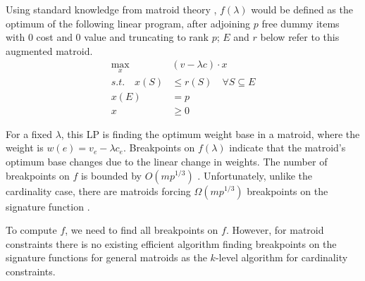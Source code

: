 \documentclass{article}
\begin{document}
Using standard knowledge from matroid theory \cite{Schrijver2003}, $f(\lambda)$ would be defined as the optimum of the following linear program, after adjoining $p$ free dummy items with 0 cost and 0 value and truncating to rank $p$; $E$ and $r$ below refer to this augmented matroid.
\begin{align*}
\max_x \quad & (v-\lambda c)\cdot x\\
s.t. \quad 
x(S)&\leq r(S)  \quad\forall S\subseteq E\\
x(E)&=p\\
x&\geq 0
\end{align*}

For a fixed $\lambda$, this LP is finding the optimum weight base in a matroid, where the weight is $w(e)=v_e-\lambda c_e$. 
Breakpoints on $f(\lambda)$ indicate that the matroid's optimum base changes due to the linear change in weights.
The number of breakpoints on $f$ is bounded by $O(mp^{1/3})$ \cite{Dey1998}. 
Unfortunately, unlike the cardinality case, there are matroids forcing $\Omega(mp^{1/3})$ breakpoints on the signature function \cite{Eppstein98}.



To compute $f$, we need to find all breakpoints on $f$. However, for matroid constraints there is no existing efficient algorithm finding breakpoints on the signature functions for general matroids as the $k$-level algorithm for cardinality constraints. 
\end{document}
